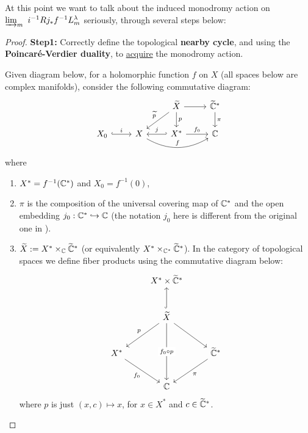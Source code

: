 \begin{remark}\label{rmk:elaborate_wu17_sect_3.1}
    At this point we want to talk about the induced monodromy action on $\varinjlim_m\ i^{-1} Rj_*f^{-1}L_m^{\lambda}$ seriously, through several steps below:
\end{remark}
\begin{proof}
    \mbox{}

    \noindent\textbf{Step1: }Correctly define the topological \textbf{nearby cycle},
    and using the \textbf{Poincar\'e-Verdier duality}, to \underline{acquire} the monodromy action.

    Given diagram below, for a holomorphic function $f$ on $X$ (all spaces below are complex manifolds), consider the following commutative diagram:
    \[
        \begin{tikzcd}
            &&\widetilde{X}\arrow{r}\arrow{d}{p}&\widetilde{\C}^*\arrow[d, "\pi"]\\
            X_0\arrow[r, hook, "i"]&\arrow[ur, leftarrow, "\widetilde{p}"] X\arrow[r, hookleftarrow, "j"]  \arrow[rr, bend right, "f"]& X^*  \arrow[r, "f_0"]&\C
        \end{tikzcd}
    \]
    where
    \begin{enumerate}
        \item $X^* = f^{-1}(\mathbb{C}^*)$ and $X_0=f^{-1}(0)$,
        \item $\pi$ is the composition of the universal covering map of $\mathbb{C}^*$ and the open embedding $j_0:\mathbb{C}^*\hookrightarrow \mathbb{C}$ (the notation $j_0$ here is different from the original one in \cite{Wu2017NearbyVanishingCycles}).
        \item $\widetilde{X} := X^* \times_{\mathbb{C}} \widetilde{\mathbb{C}}^*$ (or equivalently $X^* \times_{\mathbb{C}^*} \widetilde{\mathbb{C}}^*$).
              In the category of topological spaces we define fiber products \cite[Notation~2.3.12]{KashiwaraSchapira1994Sheaves} using the commutative diagram below:
              \[
                  \begin{tikzcd}[row sep=2.5em]
                      & X^* \times \widetilde{\C}^* \\
                      & \widetilde{X} \arrow[u, hook] \arrow[dl, "p"'] \arrow[dd, "f_0 \circ p" description] \arrow[dr] \\
                      X^* \arrow[dr, "f_0"'] & & \widetilde{\C}^* \arrow[dl, "\pi"] \\
                      & \C
                  \end{tikzcd}
              \]
              where $p$ is just $(x,c) \mapsto x$, for $x\in X^*$ and $c\in \widetilde{\mathbb{C}}^*$.


\end{enumerate}
\end{proof}
